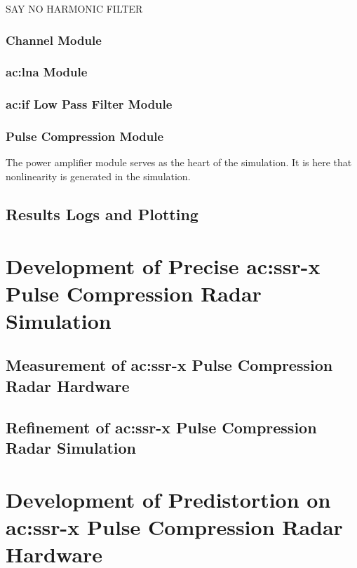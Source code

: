 SAY NO HARMONIC FILTER

\subsubsection{Channel Module}

\subsubsection{\gls{ac:lna} Module}

\subsubsection{\gls{ac:if} Low Pass Filter Module}

\subsubsection{Pulse Compression Module}

The power amplifier module serves as the heart of the simulation. It is here that nonlinearity is generated in the simulation. 

\subsection{Results Logs and Plotting}

\section{Development of Precise \gls{ac:ssr-x} Pulse Compression Radar Simulation}

\subsection{Measurement of \gls{ac:ssr-x} Pulse Compression Radar Hardware}

\subsection{Refinement of \gls{ac:ssr-x} Pulse Compression Radar Simulation}

\section{Development of Predistortion on \gls{ac:ssr-x} Pulse Compression Radar Hardware}


